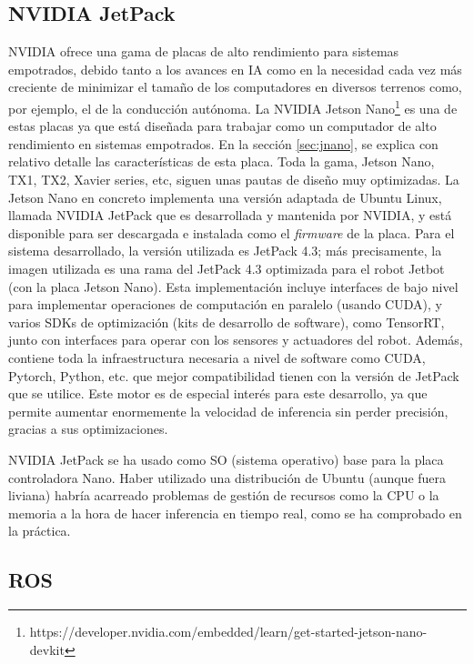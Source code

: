\subsection{NVIDIA JetPack}
\label{sec:jetpack}

NVIDIA ofrece una gama de placas de alto rendimiento para sistemas empotrados, debido tanto a los avances en IA como en la necesidad cada vez más creciente de minimizar el tamaño de los computadores en diversos terrenos como, por ejemplo, el de la conducción autónoma. La NVIDIA Jetson Nano\footnote{https://developer.nvidia.com/embedded/learn/get-started-jetson-nano-devkit} es una de estas placas ya que está diseñada para trabajar como un computador de alto rendimiento en sistemas empotrados. En la sección \ref{sec:jnano}, se explica con relativo detalle las características de esta placa. Toda la gama, Jetson Nano, TX1, TX2, Xavier series, etc, siguen unas pautas de diseño muy optimizadas. La Jetson Nano en concreto implementa una versión adaptada de Ubuntu Linux, llamada NVIDIA JetPack que es desarrollada y mantenida por NVIDIA, y está disponible para ser descargada e instalada como el \textit{firmware} de la placa. Para el sistema desarrollado, la versión utilizada es JetPack 4.3; más precisamente, la imagen utilizada es una rama del JetPack 4.3 optimizada para el robot Jetbot (con la placa Jetson Nano). Esta implementación incluye interfaces de bajo nivel para implementar operaciones de computación en paralelo (usando CUDA), y varios SDKs de optimización (kits de desarrollo de software), como TensorRT, junto con interfaces para operar con los sensores y actuadores del robot. Además, contiene toda la infraestructura necesaria a nivel de software como CUDA, Pytorch, Python, etc. que mejor compatibilidad tienen con la versión de JetPack que se utilice. Este motor es de especial interés para este desarrollo, ya que permite aumentar enormemente la velocidad de inferencia sin perder precisión, gracias a sus optimizaciones.

NVIDIA JetPack se ha usado como SO (sistema operativo) base para la placa controladora Nano. Haber utilizado una distribución de Ubuntu (aunque fuera liviana) habría acarreado problemas de gestión de recursos como la CPU o la memoria a la hora de hacer inferencia en tiempo real, como se ha comprobado en la práctica.

\subsection{ROS}

